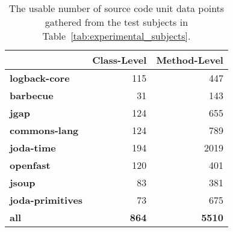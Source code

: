 \begin{sidewaystable}[!tb]
  \vspace{3em}

  \centering
  \caption{The usable number of source code unit data points gathered from the test subjects in Table~\ref{tab:experimental_subjects}.}
  \label{tab:experiments_collected_data}
  \begin{threeparttable}
    \begin{tabular}{|l|r|r|}
      \rowcolor[RGB]{169,196,223}
      \hline & \textbf{Class-Level} & \textbf{Method-Level} \\
      \hline \cellcolor[RGB]{169,196,223} \textbf{logback-core} & 115 & 447 \\
      \hline \cellcolor[RGB]{169,196,223} \textbf{barbecue} & 31 & 143 \\
      \hline \cellcolor[RGB]{169,196,223} \textbf{jgap} & 124 & 655 \\
      \hline \cellcolor[RGB]{169,196,223} \textbf{commons-lang} & 124 & 789 \\
      \hline \cellcolor[RGB]{169,196,223} \textbf{joda-time} & 194 & 2019 \\
      \hline \cellcolor[RGB]{169,196,223} \textbf{openfast} & 120 & 401 \\
      \hline \cellcolor[RGB]{169,196,223} \textbf{jsoup} & 83 & 381 \\
      \hline \cellcolor[RGB]{169,196,223} \textbf{joda-primitives} & 73 & 675 \\
      \hline \cellcolor[RGB]{169,196,223} \textbf{all} & \textbf{864} & \textbf{5510} \\
      \hline
    \end{tabular}
  \end{threeparttable}
\end{sidewaystable}
\afterpage\clearpage

